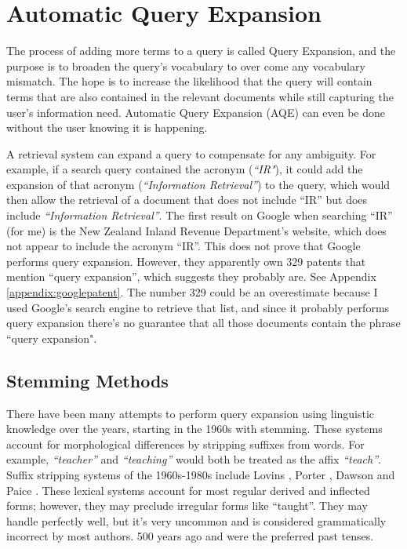 

\section{Automatic Query Expansion}
The process of adding more terms to a query is called Query Expansion, and the purpose is to broaden the query's vocabulary to over come any vocabulary mismatch. The hope is to increase the likelihood that the query will contain terms that are also contained in the relevant documents while still capturing the user's information need. Automatic Query Expansion (AQE) can even be done without the user knowing it is happening.

A retrieval system can expand a query to compensate for any ambiguity. For example, if a search query contained the acronym (\textit{``IR"}), it could add the expansion of that acronym (\textit{``Information Retrieval''}) to the query, which would then allow the retrieval of a document that does not include  ``IR'' but does include \textit{``Information Retrieval''}. The first result on Google when searching ``IR'' (for me) is the New Zealand Inland Revenue Department's website, which does not appear to include the acronym ``IR''. This does not prove that Google performs query expansion. However, they apparently own 329 patents that mention ``query expansion'', which suggests they probably are. See Appendix \ref{appendix:googlepatent}. The number 329 could be an overestimate because I used Google's search engine to retrieve that list, and since it probably performs query expansion there's no guarantee that all those documents contain the phrase ``query expansion".

\subsection{Stemming Methods}
There have been many attempts to perform query expansion using linguistic knowledge over the years, starting in the 1960s with stemming. These systems account for morphological differences by stripping suffixes from words. For example, \textit{``teacher''} and  \textit{``teaching''} would both be treated as the affix \textit{``teach''}. Suffix stripping systems of the 1960s-1980s include Lovins \cite{lovins1968development}, Porter \cite{porter1980algorithm}, Dawson \cite{dawson1974suffix} and Paice \cite{paice1990another}. These lexical systems account for most regular derived and inflected forms; however, they may preclude irregular forms like ``taught''. They may handle perfectly well, but it's very uncommon and is considered grammatically incorrect by most authors. 500 years ago and  were the preferred past tenses.

